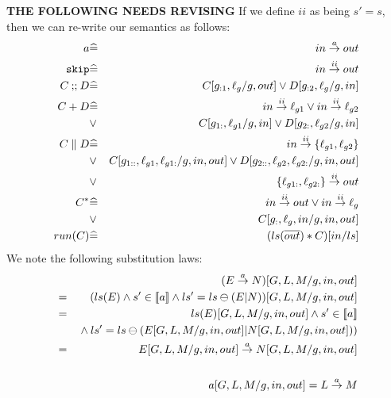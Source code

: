 \textbf{THE FOLLOWING NEEDS REVISING}
If we define $ii$ as being  $s'=s$,
then we can re-write our semantics as follows:
\begin{eqnarray*}
   a
   &\widehat=&
   in \stackrel{a}{\rightarrow} out
\\ \texttt{skip}
   &\widehat=&
   in \stackrel{ii}{\rightarrow} out
\\ C \mathbin{;\!;} D
   &\widehat=&
   C[g_{:1},\ell_g/g,out] \lor D[g_{:2},\ell_g/g,in]
\\ C + D
   &\widehat=&
   in \stackrel{ii}{\rightarrow} \ell_{g1} \lor in \stackrel{ii}{\rightarrow} \ell_{g2}
\\ &\lor&
   C[g_{1:},\ell_{g1}/g,in] \lor D[g_{2:},\ell_{g2}/g,in]
\\ C \parallel D
   &\widehat=&
   in \stackrel{ii}{\rightarrow} \{\ell_{g1},\ell_{g2}\}
\\ &\lor&
   C[g_{1::},\ell_{g1},\ell_{g1:}/g,in,out]
   \lor D[g_{2::},\ell_{g2},\ell_{g2:}/g,in,out]
\\ &\lor&
   \{\ell_{g1:},\ell_{g2:}\}
   \stackrel{ii}{\rightarrow}
   out
\\ C^*
   &\widehat=&
   in \stackrel{ii}{\rightarrow} out
   \lor
   in \stackrel{ii}{\rightarrow} \ell_g
\\ &\lor&
   C[g_{:},\ell_g,in/g,in,out]
\\ run(C)
   &\widehat=&
   ( ls(\overline{out}) * C)[in/ls]
\end{eqnarray*}
We note the following substitution laws:
\begin{eqnarray*}
  && (E \stackrel{a}{\rightarrow} N)[G,L,M/g,in,out]
\\&=& (ls(E) \land s' \in [\![{a}]\!] \land ls'=ls\ominus(E|N))[G,L,M/g,in,out]
\\&=& ls(E)[G,L,M/g,in,out]
       \land s' \in [\![{a}]\!]
\\&& {}\land ls'=ls\ominus(E[G,L,M/g,in,out]|N[G,L,M/g,in,out]))
\\&=& E[G,L,M/g,in,out] \stackrel{a}{\rightarrow} N[G,L,M/g,in,out]
\\
\\&& a[G,L,M/g,in,out] = L \stackrel{a}{\rightarrow} M
\end{eqnarray*}
